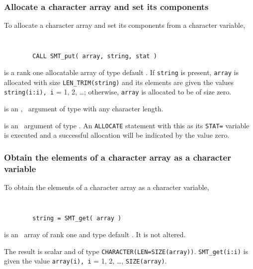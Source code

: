 \documentclass{galahad}
\begin{document}
\subsubsection{Allocate a character array and set its components}

To allocate a character array and set its components from a character variable,
\vspace*{-2mm}
{\tt 
\begin{verbatim}
        CALL SMT_put( array, string, stat )
\end{verbatim}
}
\vspace*{-4mm}
\begin{description}

 is a rank one allocatable array of type default \character.
If {\tt string} is present, {\tt array} is allocated with size 
{\tt LEN\_TRIM(string)} and
its elements are given the values {\tt string(i:i), i} = 1, 2, \ldots ;
otherwise, {\tt array} is allocated to be of size zero.

 is an \optional, \intentin\ argument of type \character
with any character length. 

 is an 
\intentout\ argument of type \integer.
An {\tt ALLOCATE} statement with this as its {\tt STAT=}
variable is executed and a successful allocation will be indicated
by the value zero. 
\end{description}

\subsubsection{Obtain the elements of a character array as a character variable}

To obtain the elements of a character array as a character variable,
\vspace*{-2mm}
{\tt 
\begin{verbatim}
        string = SMT_get( array )
\end{verbatim}
}
\vspace*{-4mm}
\begin{description}

 is an \intentin\ array of rank one and type default \character.
It is not altered.
\end{description}
The result is scalar and of type {\tt CHARACTER(LEN=SIZE(array))}.
{\tt SMT\_get(i:i)} is given the value {\tt array(i), i} = 1, 2, \ldots ,
{\tt SIZE(array)}.
\end{document}
